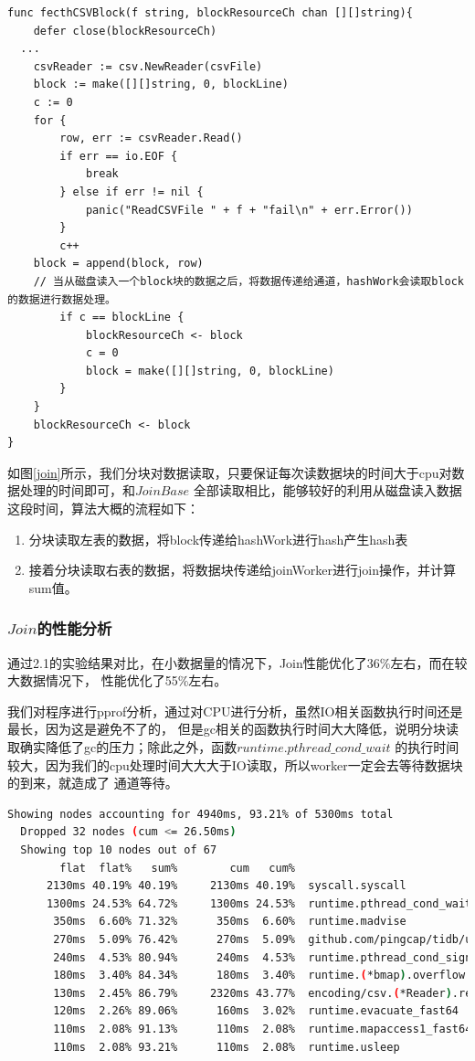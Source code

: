 \documentclass[UTF8]{ctexart}
\begin{document}
\begin{lstlisting}[language={Golang}]
func fecthCSVBlock(f string, blockResourceCh chan [][]string){
	defer close(blockResourceCh)
  ... 
	csvReader := csv.NewReader(csvFile)
	block := make([][]string, 0, blockLine)
	c := 0
	for {
		row, err := csvReader.Read()
		if err == io.EOF {
			break
		} else if err != nil {
			panic("ReadCSVFile " + f + "fail\n" + err.Error())
		}
		c++
    block = append(block, row)
    // 当从磁盘读入一个block块的数据之后，将数据传递给通道，hashWork会读取block的数据进行数据处理。
		if c == blockLine {
			blockResourceCh <- block
			c = 0
			block = make([][]string, 0, blockLine)
		}
	}
	blockResourceCh <- block
}
\end{lstlisting}

如图\ref{join}所示，我们分块对数据读取，只要保证每次读数据块的时间大于cpu对数据处理的时间即可，和$JoinBase$
全部读取相比，能够较好的利用从磁盘读入数据这段时间，算法大概的流程如下：

\begin{enumerate}
  \item 分块读取左表的数据，将block传递给hashWork进行hash产生hash表
  \item 接着分块读取右表的数据，将数据块传递给joinWorker进行join操作，并计算sum值。
\end{enumerate}


\subsubsection{$Join$的性能分析}

通过2.1的实验结果对比，在小数据量的情况下，Join性能优化了36\%左右，而在较大数据情况下，
性能优化了55\%左右。

我们对程序进行pprof分析，通过对CPU进行分析，虽然IO相关函数执行时间还是最长，因为这是避免不了的，
但是gc相关的函数执行时间大大降低，说明分块读取确实降低了gc的压力；除此之外，函数$runtime.pthread\_cond\_wait$
的执行时间较大，因为我们的cpu处理时间大大大于IO读取，所以worker一定会去等待数据块的到来，就造成了
通道等待。

\begin{lstlisting}[language={bash}]
  Showing nodes accounting for 4940ms, 93.21% of 5300ms total
  Dropped 32 nodes (cum <= 26.50ms)
  Showing top 10 nodes out of 67
        flat  flat%   sum%        cum   cum%
      2130ms 40.19% 40.19%     2130ms 40.19%  syscall.syscall
      1300ms 24.53% 64.72%     1300ms 24.53%  runtime.pthread_cond_wait
       350ms  6.60% 71.32%      350ms  6.60%  runtime.madvise
       270ms  5.09% 76.42%      270ms  5.09%  github.com/pingcap/tidb/util/mvmap.(*entryStore).put
       240ms  4.53% 80.94%      240ms  4.53%  runtime.pthread_cond_signal
       180ms  3.40% 84.34%      180ms  3.40%  runtime.(*bmap).overflow
       130ms  2.45% 86.79%     2320ms 43.77%  encoding/csv.(*Reader).readRecord
       120ms  2.26% 89.06%      160ms  3.02%  runtime.evacuate_fast64
       110ms  2.08% 91.13%      110ms  2.08%  runtime.mapaccess1_fast64
       110ms  2.08% 93.21%      110ms  2.08%  runtime.usleep
\end{lstlisting}
\end{document}
